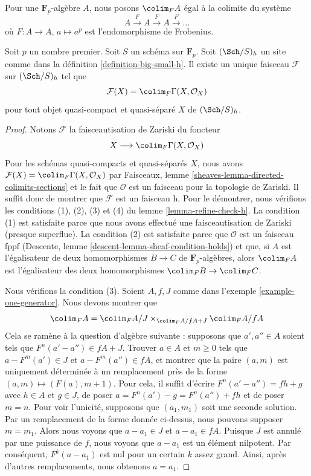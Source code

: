 \noindent
Pour une $\mathbf{F}_p$-algèbre $A$,
nous posons $\colim_F A$ égal à la colimite du système
$$
A \xrightarrow{F} A \xrightarrow{F} A \xrightarrow{F} \ldots
$$
où $F : A \to A$, $a \mapsto a^p$ est l'endomorphisme de Frobenius.

\begin{lemma}
\label{lemma-h-sheaf-colim-F}
Soit $p$ un nombre premier. Soit $S$ un schéma sur $\mathbf{F}_p$.
Soit $(\Sch/S)_h$ un site comme dans la définition \ref{definition-big-small-h}.
Il existe un unique faisceau $\mathcal{F}$ sur $(\Sch/S)_h$ tel que
$$
\mathcal{F}(X) = \colim_F \Gamma(X, \mathcal{O}_X)
$$
pour tout objet quasi-compact et quasi-séparé $X$ de $(\Sch/S)_h$.
\end{lemma}

\begin{proof}
Notons $\mathcal{F}$ la faisceautisation de Zariski
du foncteur
$$
X \longrightarrow \colim_F \Gamma(X, \mathcal{O}_X)
$$
Pour les schémas quasi-compacts et quasi-séparés $X$,
nous avons $\mathcal{F}(X) = \colim_F \Gamma(X, \mathcal{O}_X)$
par Faisceaux, lemme \ref{sheaves-lemma-directed-colimits-sections}
et le fait que $\mathcal{O}$ est un faisceau pour la topologie de Zariski.
Il suffit donc de montrer que $\mathcal{F}$ est un faisceau h.
Pour le démontrer, nous vérifions les conditions (1), (2), (3) et (4) du
lemme \ref{lemma-refine-check-h}.
La condition (1) est satisfaite parce que nous avons effectué une faisceautisation
de Zariski (presque superflue). La condition (2) est satisfaite parce que
$\mathcal{O}$ est un faisceau fppf (Descente, lemme
\ref{descent-lemma-sheaf-condition-holds}) et que, si
$A$ est l'égalisateur de deux homomorphismes $B \to C$ de $\mathbf{F}_p$-algèbres,
alors $\colim_F A$ est l'égalisateur des deux homomorphismes
$\colim_F B \to \colim_F C$.

\medskip\noindent
Nous vérifions la condition (3). Soient $A, f, J$ comme dans
l'exemple \ref{example-one-generator}.
Nous devons montrer que
$$
\colim_F A = \colim_F A/J \times_{\colim_F A/fA + J} \colim_F A/fA
$$
Cela se ramène à la question d'algèbre suivante : supposons que $a', a'' \in A$
soient tels que $F^n(a' - a'') \in fA + J$. Trouver $a \in A$ et $m \geq 0$
tels que $a - F^m(a') \in J$ et $a - F^m(a'') \in fA$, et montrer que
la paire $(a, m)$ est uniquement déterminée à un remplacement près de la
forme $(a, m) \mapsto (F(a), m + 1)$.
Pour cela, il suffit d'écrire $F^n(a' - a'') = f h + g$ avec $h \in A$ et $g \in J$,
de poser $a = F^n(a') - g = F^n(a'') + fh$ et de poser $m = n$.
Pour voir l'unicité, supposons que $(a_1, m_1)$ soit une seconde solution.
Par un remplacement de la forme donnée ci-dessus, nous pouvons supposer $m = m_1$.
Alors nous voyons que $a - a_1 \in J$ et $a - a_1 \in fA$.
Puisque $J$ est annulé par une puissance de $f$, nous voyons que
$a - a_1$ est un élément nilpotent. Par conséquent, $F^k(a - a_1)$ est nul
pour un certain $k$ assez grand. Ainsi, après d'autres remplacements, nous obtenons
$a = a_1$.


\end{proof}
